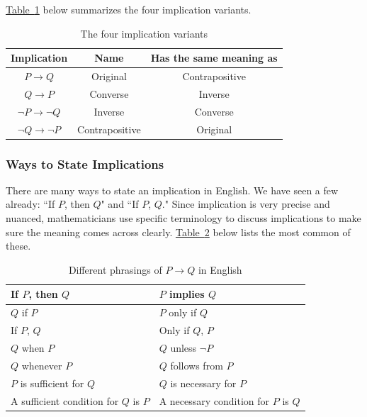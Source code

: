 \documentclass[11pt,oneside]{book}
\theoremstyle{definition}
\begin{document}
\hyperref[tab:EnglishImplications]{Table~\ref*{tab:Implications}} below summarizes the four implication variants.

\begin{table}[H]
\centering
\begin{tabular}[t]{|c|c|c|}
    \multicolumn{1}{c}{Implication} & \multicolumn{1}{c}{Name} & \multicolumn{1}{c}{Has the same meaning as} \\
    \hline
    $P \rightarrow Q$ & Original & Contrapositive \\
    \hline
    $Q \rightarrow P$ & Converse & Inverse \\
    \hline
    $\lnot P \rightarrow \lnot Q$ & Inverse & Converse \\
    \hline
    $\lnot Q \rightarrow \lnot P$ & Contrapositive & Original \\
    \hline
\end{tabular}
\caption{The four implication variants}
\label{tab:Implications}
\end{table}


\subsubsection{Ways to State Implications} %
There are many ways to state an implication in English.
We have seen a few already: ``If $P$, then $Q$" and ``If $P$, $Q$."
Since implication is very precise and nuanced, mathematicians use specific terminology to discuss implications to make sure the meaning comes across clearly.
\hyperref[tab:EnglishImplications]{Table~\ref*{tab:EnglishImplications}} below lists the most common of these.

\begin{table}[H]
\centering
\begin{tabular}[t]{|l|l|}
    \hline
    If $P$, then $Q$ & $P$ implies $Q$ \\
    \hline
    $Q$ if $P$ & $P$ only if $Q$ \\
    \hline
    If $P$, $Q$ & Only if $Q$, $P$ \\
    \hline
    $Q$ when $P$ & $Q$ unless $\lnot P$ \\
    \hline
    $Q$ whenever $P$ & $Q$ follows from $P$ \\
    \hline
    $P$ is sufficient for $Q$ & $Q$ is necessary for $P$ \\
    \hline
    A sufficient condition for $Q$ is $P$ & A necessary condition for $P$ is $Q$ \\
    \hline
\end{tabular}
\caption{Different phrasings of $P \rightarrow Q$ in English}
\label{tab:EnglishImplications}
\end{table}
\end{document}
